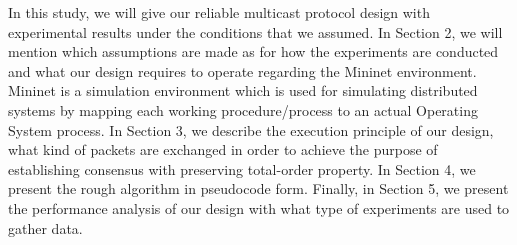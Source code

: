 \documentclass[a4paper, 12pt]{article}
\begin{document}
In this study, we will give our reliable multicast protocol design with experimental results under the conditions that we assumed. In Section 2, we will mention which assumptions are made as for how the experiments are conducted and what our design requires to operate regarding the Mininet environment. Mininet is a simulation environment which is used for simulating distributed systems by mapping each working procedure/process to an actual Operating System process. In Section 3, we describe the execution principle of our design, what kind of packets are exchanged in order to achieve the purpose of establishing consensus with preserving total-order property. In Section 4, we present the rough algorithm in pseudocode form. Finally, in Section 5, we present the performance analysis of our design with what type of experiments are used to gather data.
\end{document}

